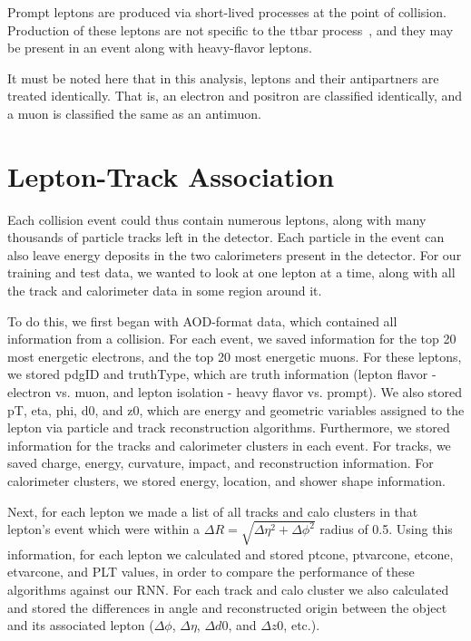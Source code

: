 Prompt leptons are produced via short-lived processes at the point of collision. Production of these leptons are not specific to the ttbar process~\cite{bodek}, and they may be present in an event along with heavy-flavor leptons.

It must be noted here that in this analysis, leptons and their antipartners are treated identically. That is, an electron and positron are classified identically, and a muon is classified the same as an antimuon.

\section{Lepton-Track Association}

Each collision event could thus contain numerous leptons, along with many thousands of particle tracks left in the detector. Each particle in the event can also leave energy deposits in the two calorimeters present in the detector. For our training and test data, we wanted to look at one lepton at a time, along with all the track and calorimeter data in some region around it.

To do this, we first began with AOD-format data, which contained all information from a collision. For each event, we saved information for the top 20 most energetic electrons, and the top 20 most energetic muons. For these leptons, we stored pdgID and truthType, which are truth information (lepton flavor - electron vs. muon, and lepton isolation - heavy flavor vs. prompt). We also stored pT, eta, phi, d0, and z0, which are energy and geometric variables assigned to the lepton via particle and track reconstruction algorithms. Furthermore, we stored information for the tracks and calorimeter clusters in each event. For tracks, we saved charge, energy, curvature, impact, and reconstruction information. For calorimeter clusters, we stored energy, location, and shower shape information.

Next, for each lepton we made a list of all tracks and calo clusters in that lepton's event which were within a $\Delta R = \sqrt{\Delta\eta^2 + \Delta\phi^2}$ radius of 0.5. Using this information, for each lepton we calculated and stored ptcone, ptvarcone, etcone, etvarcone, and PLT values, in order to compare the performance of these algorithms against our RNN. For each track and calo cluster we also calculated and stored the differences in angle and reconstructed origin between the object and its associated lepton ($\Delta\phi$, $\Delta\eta$, $\Delta d0$, and $\Delta z0$, etc.).

